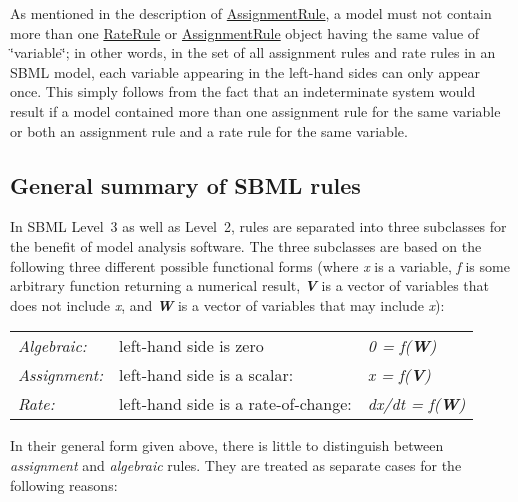 As mentioned in the description of \hyperlink{class_assignment_rule}{Assignment\+Rule}, a model must not contain more than one \hyperlink{class_rate_rule}{Rate\+Rule} or \hyperlink{class_assignment_rule}{Assignment\+Rule} object having the same value of \char`\"{}variable\char`\"{}; in other words, in the set of all assignment rules and rate rules in an S\+B\+ML model, each variable appearing in the left-\/hand sides can only appear once. This simply follows from the fact that an indeterminate system would result if a model contained more than one assignment rule for the same variable or both an assignment rule and a rate rule for the same variable.\hypertarget{classdoc__rules__general__summary_rules-general}{}\subsection{General summary of S\+B\+M\+L rules}\label{classdoc__rules__general__summary_rules-general}
In S\+B\+ML Level~3 as well as Level~2, rules are separated into three subclasses for the benefit of model analysis software. The three subclasses are based on the following three different possible functional forms (where {\itshape x} is a variable, {\itshape f} is some arbitrary function returning a numerical result, {\bfseries {\itshape V}} is a vector of variables that does not include {\itshape x}, and {\bfseries {\itshape W}} is a vector of variables that may include {\itshape x})\+:

\tabulinesep=1mm
\begin{longtabu} spread 0pt [c]{*{3}{|X[-1]}|}
\hline
{\itshape Algebraic\+:}&left-\/hand side is zero&{\itshape 0 = f({\bfseries W})} \\
{\itshape Assignment\+:}&left-\/hand side is a scalar\+:&{\itshape x = f({\bfseries V})} \\
{\itshape Rate\+:}&left-\/hand side is a rate-\/of-\/change\+:&{\itshape dx/dt = f({\bfseries W})} \\
\end{longtabu}


In their general form given above, there is little to distinguish between {\itshape assignment} and {\itshape algebraic} rules. They are treated as separate cases for the following reasons\+:

